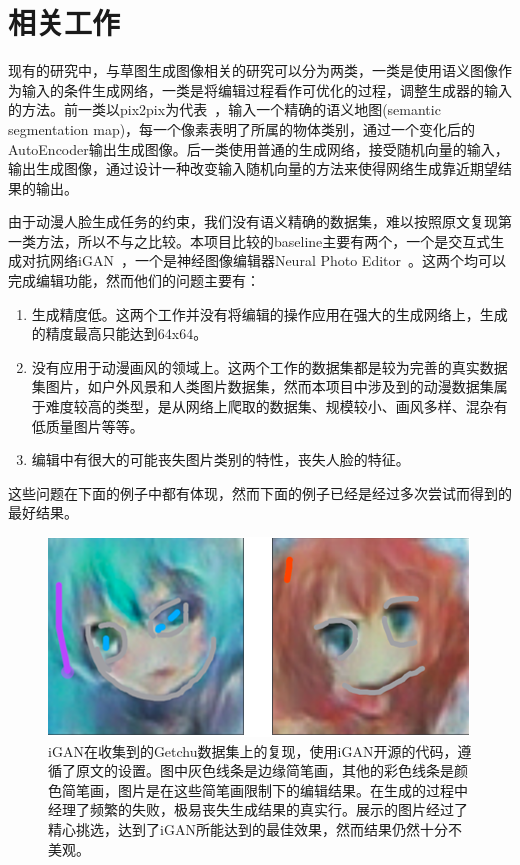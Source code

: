 \documentclass[a4paper,12pt,UTF8]{ctexart}
\newcommand{\kai}{\CJKfamily{zhkai}}	%
\begin{document}
\section{相关工作}


现有的研究中，与草图生成图像相关的研究可以分为两类，一类是使用语义图像作为输入的条件生成网络，一类是将编辑过程看作可优化的过程，调整生成器的输入的方法。前一类以pix2pix为代表~\cite{isola2016image}，输入一个精确的语义地图(semantic segmentation map)，每一个像素表明了所属的物体类别，通过一个变化后的AutoEncoder输出生成图像。后一类使用普通的生成网络，接受随机向量的输入，输出生成图像，通过设计一种改变输入随机向量的方法来使得网络生成靠近期望结果的输出。

由于动漫人脸生成任务的约束，我们没有语义精确的数据集，难以按照原文复现第一类方法，所以不与之比较。本项目比较的baseline主要有两个，一个是交互式生成对抗网络iGAN~\cite{Zhu2016Generative}，一个是神经图像编辑器Neural Photo Editor~\cite{Brock2016Neural}。这两个均可以完成编辑功能，然而他们的问题主要有：

\begin{enumerate}
\item 生成精度低。这两个工作并没有将编辑的操作应用在强大的生成网络上，生成的精度最高只能达到64x64。
\item 没有应用于动漫画风的领域上。这两个工作的数据集都是较为完善的真实数据集图片，如户外风景和人类图片数据集，然而本项目中涉及到的动漫数据集属于难度较高的类型，是从网络上爬取的数据集、规模较小、画风多样、混杂有低质量图片等等。
\item 编辑中有很大的可能丧失图片类别的特性，丧失人脸的特征。
\end{enumerate}

这些问题在下面的例子中都有体现，然而下面的例子已经是经过多次尝试而得到的最好结果。

\begin{figure}[H]
  \centering
  \includegraphics[width=0.9\linewidth]{figs/baseline1.PNG}
  \caption{\kai iGAN在收集到的Getchu数据集上的复现，使用iGAN开源的代码，遵循了原文的设置。图中灰色线条是边缘简笔画，其他的彩色线条是颜色简笔画，图片是在这些简笔画限制下的编辑结果。在生成的过程中经理了频繁的失败，极易丧失生成结果的真实行。展示的图片经过了精心挑选，达到了iGAN所能达到的最佳效果，然而结果仍然十分不美观。}
  \label{fig:baseline1}
\end{figure}
\end{document}
